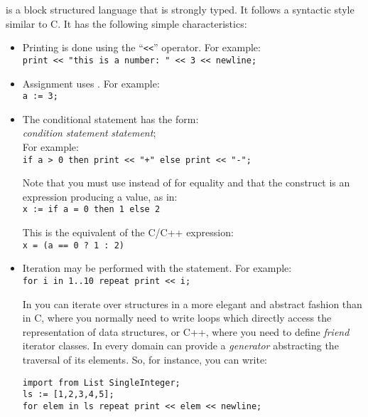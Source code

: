 \asharp{} is a block structured language that is strongly typed. It follows
a syntactic style similar to C. It has the following simple characteristics:
\begin{itemize}
\item Printing is done using the ``\verb+<<+'' operator.  For example:\\
{\small \verb+print << "this is a number: " << 3 << newline;+ }

\item Assignment uses \ttin{:=}.  For example:\\
{\small \verb+a := 3;+ }

\item The conditional statement has the form: \\
 {\it condition}  {\it statement}
 {\it statement}; \\
For example: \\
{\small \verb^if a > 0 then print << "+" else print << "-";^ }

Note that you must use \ttin{=} instead of \ttin{==} for equality and that the
 construct is an expression producing a
value, as in: \\
{\small \verb^x := if a = 0 then 1 else 2^}

This is the equivalent of the C/C++ expression: \\
 {\small \verb^x = (a == 0 ? 1 : 2)^}

\item Iteration may be performed with the  statement. For
\linebreak example: \\
{\small \verb+for i in 1..10 repeat print << i;+ }

In \asharp{} you can iterate over structures in a more elegant and
abstract fashion than in C, where you normally need to write loops which
directly access the representation of data structures, or C++, where
you need to define {\em friend}
iterator classes. In \asharp{} every domain can provide a 
{\em generator} abstracting the traversal of its elements. So, for
instance, you can write:

\begin{small}%
\begin{verbatim}
import from List SingleInteger;
ls := [1,2,3,4,5];
for elem in ls repeat print << elem << newline;
\end{verbatim}
\end{small}


\end{itemize}
